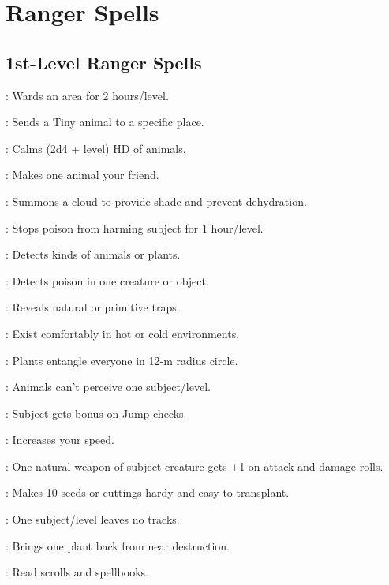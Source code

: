 \section{Ranger Spells}



\subsection{1st-Level Ranger Spells}

: Wards an area for 2 hours/level.

: Sends a Tiny animal to a specific place.

: Calms (2d4 + level) HD of animals.

: Makes one animal your friend.

: Summons a cloud to provide shade and prevent dehydration. %

: Stops poison from harming subject for 1 hour/level.

: Detects kinds of animals or plants.

: Detects poison in one creature or object.

: Reveals natural or primitive traps.

: Exist comfortably in hot or cold environments.

: Plants entangle everyone in 12-m radius circle.

: Animals can't perceive one subject/level.

: Subject gets bonus on Jump checks.

: Increases your speed.

: One natural weapon of subject creature gets +1 on attack and damage rolls.

: Makes 10 seeds or cuttings hardy and easy to transplant. %

: One subject/level leaves no tracks.

: Brings one plant back from near destruction. %

: Read scrolls and spellbooks.

